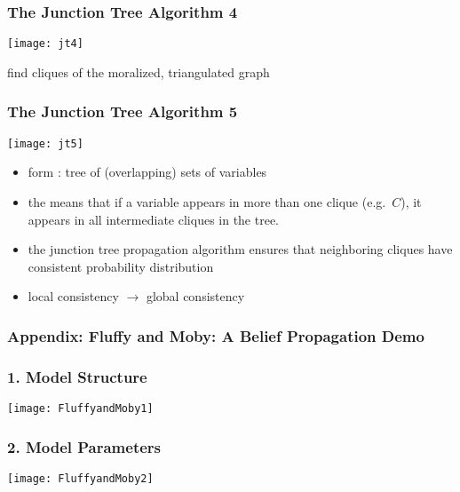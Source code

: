 \begin{frame}
\frametitle{The Junction Tree Algorithm 4}

\vspace*{-3ex}
\centerline{\texttt{[image: jt4]}}

find cliques of the moralized, triangulated graph
\end{frame}
\begin{frame}
\frametitle{The Junction Tree Algorithm 5}

\centerline{\texttt{[image: jt5]}}

\begin{itemize}
\item form : tree of (overlapping) sets of variables
\item the  means that if a variable
  appears in more than one clique (e.g.\ $C$), it appears in all
  intermediate cliques in the tree.
\item the junction tree propagation algorithm ensures that neighboring
cliques have consistent probability distribution
\item local consistency $\rightarrow$ global consistency  
\end{itemize}

\end{frame}
\begin{frame}
\frametitle{Appendix: Fluffy and Moby: A Belief Propagation Demo}


\end{frame}
\begin{frame}
\frametitle{1. Model Structure}

\phantom{.} \hfill 
\texttt{[image: FluffyandMoby1]}


\end{frame}
\begin{frame}
\frametitle{2. Model Parameters}

\phantom{.} \hfill 
\texttt{[image: FluffyandMoby2]}

\end{frame}
